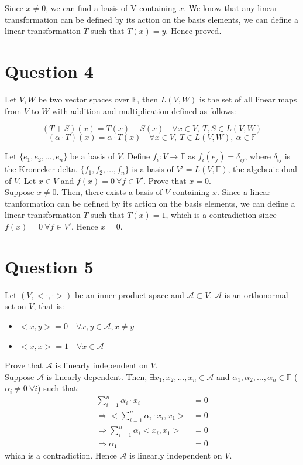 \documentclass{article}
\begin{document}
	Since $x \ne 0$, we can find a basis of V containing $x$.
	We know that any linear transformation can be defined by its action on the basis elements,
	we can define a linear transformation $T$ such that $T(x) = y$.
	Hence proved.
	
\section{Question 4}

	Let $V, W$ be two vector spaces over $\mathbb{F}$, then $L(V, W)$ is the set of all linear
	maps from $V$ to $W$ with addition and multiplication defined as follows:

	\[ (T + S)(x) = T(x) + S(x) \quad \forall x \in V, ~ T, S \in L(V, W) \]
	\[ (\alpha \cdot T)(x) = \alpha \cdot T(x) \quad \forall x \in V, ~ T \in L(V, W), ~
	\alpha \in \mathbb{F} \]

	Let $\{e_1, e_2, \dots, e_n\}$ be a basis of $V$.
	Define $f_i: V \to \mathbb{F}$ as $f_i(e_j) = \delta_{ij}$, where $\delta_{ij}$ is the
	Kronecker delta.
	$\{f_1, f_2, \dots, f_n\}$ is a basis of $V' = L(V, \mathbb{F})$, the algebraic dual
	of $V$.
	Let $x \in V$ and $f(x) = 0 ~ \forall f \in V'$.
	Prove that $x = 0$. \\

	Suppose $x \ne 0$.
	Then, there exists a basis of $V$ containing $x$.
	Since a linear tranformation can be defined by its action on the basis elements,
	we can define a linear transformation $T$ such that $T(x) = 1$, which is a contradiction
	since $f(x) = 0 ~ \forall f \in V'$.
	Hence $x = 0$.

\section{Question 5}

	Let $(V, <\cdot, \cdot>)$ be an inner product space and $\mathcal{A} \subset V$.
	$\mathcal{A}$ is an orthonormal set on $V$, that is:
	\begin{itemize}
		\item $<x, y> = 0 \quad \forall x, y \in \mathcal{A}, x \ne y$
		\item $<x, x> = 1 \quad \forall x \in \mathcal{A}$
	\end{itemize}
	Prove that $\mathcal{A}$ is linearly independent on $V$. \\

	Suppose $\mathcal{A}$ is linearly dependent.
	Then, $\exists x_1, x_2, \dots, x_n \in \mathcal{A}$ and $\alpha_1, \alpha_2, \dots,
	\alpha_n \in \mathbb{F}$ ($\alpha_i \ne 0 ~ \forall i$) such that:
	\begin{align*}
		\sum_{i = 1}^{n} \alpha_i \cdot x_i &= 0 \\
		\Rightarrow <\sum_{i = 1}^{n} \alpha_i \cdot x_i, x_1> &= 0 \\
		\Rightarrow \sum_{i = 1}^{n} \alpha_i <x_i, x_1> &= 0 \\
		\Rightarrow \alpha_1 &= 0
	\end{align*}
	which is a contradiction.
	Hence $\mathcal{A}$ is linearly independent on $V$.
\end{document}
